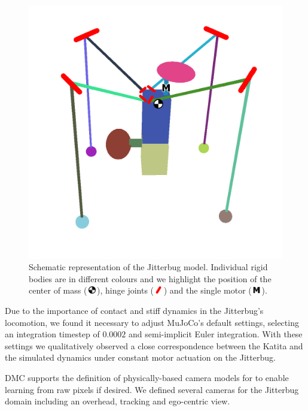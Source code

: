 \documentclass[letterpaper, 10 pt, conference]{ieeeconf}
\newcommand{\com}{\,\includegraphics[width=9pt]{ico-com}\,}
\newcommand{\hinge}{\,\includegraphics[width=9pt]{ico-hinge}\,}
\newcommand{\motor}{\,\includegraphics[width=9pt]{ico-motor}\,}
\begin{document}
\begin{figure}[ht]
    \centering
    \includegraphics[width=\linewidth]{fig-jitterbug-parts}
    \caption[
        Schematic representation of the Jitterbug model.
        Individual rigid bodies are in different colours and we highlight the position of the center of mass, hinge joints and the single motor.
    ]{
        Schematic representation of the Jitterbug model.
        Individual rigid bodies are in different colours and we highlight the position of the center of mass (\protect\com), hinge joints  (\protect\hinge) and the single motor (\protect\motor).
    }
    \label{fig:parts}
\end{figure}

Due to the importance of contact and stiff dynamics in the Jitterbug's locomotion, we found it necessary to adjust MuJoCo's default settings, selecting an integration timestep of $0.0002$ and semi-implicit Euler integration.
With these settings we qualitatively observed a close correspondence between the Katita and the simulated dynamics under constant motor actuation on the Jitterbug.

DMC supports the definition of physically-based camera models for to enable learning from raw pixels if desired.
We defined several cameras for the Jitterbug domain including an overhead, tracking and ego-centric view.
\end{document}
